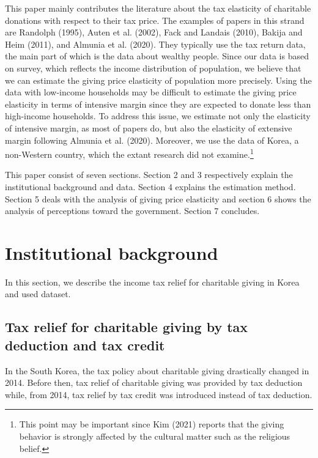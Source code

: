 \documentclass[ review  , 3p ]{elsarticle}
\begin{document}
  This paper mainly contributes the literature about the tax elasticity of charitable donations with respect to their tax price. The examples of papers in this strand are Randolph (1995), Auten et al. (2002), Fack and Landais (2010), Bakija and Heim (2011), and Almunia et al. (2020). They typically use the tax return data, the main part of which is the data about wealthy people. Since our data is based on survey, which reflects the income distribution of population, we believe that we can estimate the giving price elasticity of population more precisely. Using the data with low-income households may be difficult to estimate the giving price elasticity in terms of intensive margin since they are expected to donate less than high-income households. To address this issue, we estimate not only the elasticity of intensive margin, as most of papers do, but also the elasticity of extensive margin following Almunia et al. (2020).
  Moreover, we use the data of Korea, a non-Western country, which the extant research did not examine.\footnote{This point may be important since Kim (2021) reports that the giving behavior is strongly affected by the cultural matter such as the religious belief.}

  This paper consist of seven sections. Section 2 and 3 respectively explain the institutional background and data. Section 4 explains the estimation method. Section 5 deals with the analysis of giving price elasticity and section 6 shows the analysis of perceptions toward the government. Section 7 concludes.

  \hypertarget{institutional-background}{%
  \section{Institutional background}\label{institutional-background}}

  In this section, we describe the income tax relief for charitable giving in Korea and used dataset.

  \hypertarget{tax-relief-for-charitable-giving-by-tax-deduction-and-tax-credit}{%
  \subsection{Tax relief for charitable giving by tax deduction and tax credit}\label{tax-relief-for-charitable-giving-by-tax-deduction-and-tax-credit}}

  In the South Korea, the tax policy about charitable giving drastically changed in 2014. Before then, tax relief of charitable giving was provided by tax deduction while, from 2014, tax relief by tax credit was introduced instead of tax deduction.
\end{document}
